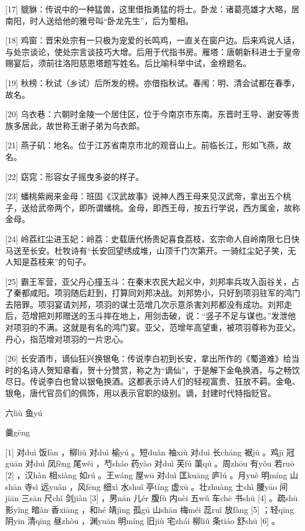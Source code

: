 \documentclass[12pt,UTF8]{ctexbook}
\begin{document}
[17] 貔貅：传说中的一种猛兽，这里借指勇猛的将士。卧龙：诸葛亮雄才大略，居南阳，时人送给他的雅号叫“卧龙先生”，后为蜀相。

[18] 鸡窗：晋宋处宗有一只极为宠爱的长鸣鸡，一直关在窗户边。后来鸡说人话，与处宗谈论，使处宗言谈技巧大增。后用于代指书房。雁塔：唐朝新科进士于皇帝赐宴后，须前往洛阳慈恩塔题写姓名。后比喻科举中试，金榜题名。

[19] 秋榜：秋试（乡试）后所发的榜。亦借指秋试。春闱：明、清会试都在春季，故名。

[20] 乌衣巷：六朝时金陵一个居住区，位于今南京市东南。东晋时王导、谢安等贵族多居此，故世称王谢子弟为乌衣郎。

[21] 燕子矶：地名。位于江苏省南京市北的观音山上。前临长江，形如飞燕，故名。

[22] 窈窕：形容女子摇曳多姿的样子。

[23] 蟠桃紫阙来金母：班固《汉武故事》说神人西王母来见汉武帝，拿出五个桃子，送给武帝两个，即所谓蟠桃。金母，即西王母，按五行学说，西方属金，故称金母。

[24] 岭荔红尘进玉妃：岭荔：史载唐代杨贵妃喜食荔枝，玄宗命人自岭南限七日快马送至长安。杜牧诗有“长安回望绣成堆，山顶千门次第开。一骑红尘妃子笑，无人知是荔枝来”的句子。

[25] 霸王军营，亚父丹心撞玉斗：在秦末农民大起义中，刘邦率兵攻入函谷关，占了秦都咸阳。项羽随后赶到，打算同刘邦决战。刘邦势小，只好到项羽驻军的鸿门去陪罪。项羽宴请刘邦，项羽的谋士范增几次示意杀害刘邦都没有成功。刘邦走后，范增把刘邦赠送的玉斗摔在地上，用剑击破，说：“竖子不足与谋也。”发泄他对项羽的不满。这就是有名的鸿门宴。亚父，范增年高望重，被项羽尊称为亚父。丹心，指范增对项羽的一片忠心。

[26] 长安酒市，谪仙狂兴换银龟：传说李白初到长安，拿出所作的《蜀道难》给当时的名诗人贺知章看，贺十分赞赏，称之为“谪仙”，于是解下金龟换酒，与之畅饮尽日。传说李白也曾以银龟换酒。这都表示诗人们的轻视富贵、狂放不羁。金龟、银龟，唐代官员们的佩饰，用以表示官职的级别。谪，封建时代特指贬官。





六liù 鱼yú


羹gēng





[1] 对duì 饭fàn ，柳liǔ 对duì 榆yú 。短duǎn 袖xiù 对duì 长cháng 裾jū 。鸡jī 冠guān 对duì 凤fèng 尾wěi ，芍sháo 药yào 对duì 芙fú 蕖qú 。周zhōu 有yǒu 若ruò [2] ，汉hàn 相xiàng 如rú 。王wáng 屋wū 对duì 匡kuāng 庐lú 。月yuè 明míng 山shān 寺sì 远yuǎn ，风fēng 细xì 水shuǐ 亭tíng 虚xū 。壮zhuàng 士shì 腰yāo 间jiān 三sān 尺chǐ 剑jiàn [3] ，男nán 儿ér 腹fù 内nèi 五wǔ 车chē 书shū [4] 。疏shū 影yǐng 暗àn 香xiāng ，和hé 靖jìng 孤gū 山shān 梅méi 蕊ruǐ 放fàng [5] ；轻qīng 阴yīn 清qīng 昼zhòu ，渊yuān 明míng 旧jiù 宅zhái 柳liǔ 条tiáo 舒shū [6] 。
\end{document}
